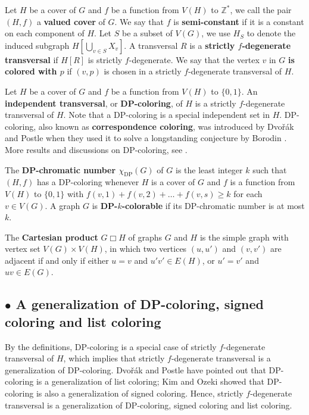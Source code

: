 \documentclass{article}
\theoremstyle{definition}
\begin{document}
Let $H$ be a cover of $G$ and $f$ be a function from $V(H)$ to $\mathbb{Z}^{*}$, we call the pair $(H, f)$ a \textbf{valued cover} of $G$. We say that $f$ is \textbf{semi-constant} if it is a constant on each component of $H$. Let $S$ be a subset of $V(G)$, we use $H_{S}$ to denote the induced subgraph $H[\bigcup_{v \in S} X_{v}]$. A transversal $R$ is a \textbf{strictly $f$-degenerate transversal} if $H[R]$ is strictly $f$-degenerate. We say that the vertex $v$ in $G$ \textbf{is colored with $p$} if $(v, p)$ is chosen in a strictly $f$-degenerate transversal of $H$. 

Let $H$ be a cover of $G$ and $f$ be a function from $V(H)$ to $\{0, 1\}$. An \textbf{independent transversal}, or \textbf{DP-coloring}, of $H$ is a strictly $f$-degenerate transversal of $H$. Note that a DP-coloring is a special independent set in $H$. DP-coloring, also known as \textbf{correspondence coloring}, was introduced by Dvo\v{r}\'{a}k and Postle \cite{MR3758240} when they used it to solve a longstanding conjecture by Borodin \cite{MR3004485}. More results and discussions on DP-coloring, see \cite{MR3679840, MR3518419, MR3889157, MR4043754, MR3957361, MR3948125}. 

The \textbf{DP-chromatic number $\chi_{\mathrm{DP}}(G)$} of $G$ is the least integer $k$ such that $(H, f)$ has a DP-coloring whenever $H$ is a cover of $G$ and $f$ is a function from $V(H)$ to $\{0, 1\}$ with $f(v, 1) + f(v, 2) + \dots + f(v, s) \geq k$ for each $v \in V(G)$. A graph $G$ is \textbf{DP-$k$-colorable} if its DP-chromatic number is at most $k$. 

The \textbf{Cartesian product} $G \Box H$ of graphs $G$ and $H$ is the simple graph with vertex set $V(G) \times V(H)$, in which two vertices $(u, u')$ and $(v, v')$ are adjacent if and only if either $u = v$ and $u'v' \in E(H)$, or $u' = v'$ and $uv \in E(G)$.


\subsection*{$\bullet$ A generalization of DP-coloring, signed coloring and list coloring}
By the definitions, DP-coloring is a special case of strictly $f$-degenerate transversal of $H$, which implies that strictly $f$-degenerate transversal is a generalization of DP-coloring. Dvo\v{r}\'{a}k and Postle \cite{MR3758240} have pointed out that DP-coloring is a generalization of list coloring; Kim and Ozeki \cite{MR3948125} showed that DP-coloring is also a generalization of signed coloring. Hence, strictly $f$-degenerate transversal is a generalization of DP-coloring, signed coloring and list coloring. 
\end{document}
